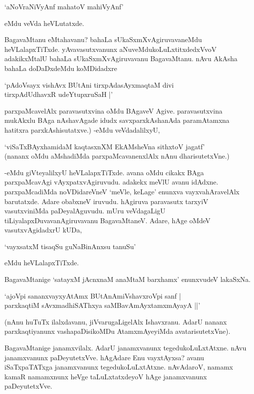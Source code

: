 \begin{shloka}
`aNoVraNiVyAnf mahatoV mahiVyAnf'
\end{shloka}

eMdu veVda heVLutatxde.

BagavaMtanu eMtahavanu? bahaLa sUkaSxmXvAgiruvavaneMdu heVLalapxTiTxde. yAvavasutxvanunx aNuveMdukoLuLxtitxdedxVvoV adakikxMtalU bahaLa sUkaSxmXvAgiruvavanu BagavaMtanu. nAvu AkAsha bahaLa doDaDxdeMdu koMDidadxre 

\begin{shloka}
`pAdoV\s sayx vishAvx BUtAni tirxpAdasAyxmaqtaM divi\\
tirxpAdUdhavxR udeYtupxruSaH‌ |'
\end{shloka}

parxpaMcavelAlx paravasutxvina oMdu BAgaveV Agive. paravasutxvina mukAkxlu BAga nAshavAgade idudx savxparxkAshanAda paramAtamxna hatitxra parxkAshisutatxve.) -eMdu veVdadalilxyU,

\begin{shloka}
`viSaTxBAyxhamidaM kaqtasxnXM EkAMsheVna sithxtoV jagatf'\\
(nananx oMdu aMshadiMda parxpaMcavanenxlAlx nAnu dharisutetxVne.)
\end{shloka}

-eMdu giVteyalilxyU heVLalapxTiTxde. avana oMdu cikakx BAga parxpaMcavAgi vAyxpatxvAgiruvudu. adakekx meVlU avanu idAdxne. parxpaMcadiMda noVDidareVneV `meVle, keLage' enunxva vayxvahAravelAlx barutatxde. Adare obabxneV iruvudu. hAgiruva paravasutx tarxyiV vasutxviniMda paDeyalAguvudu. mUru veVdagaLigU tiLiyalapxDuvavanAgiruvavanu BagavaMtaneV. Adare, hAge oMdeV vasutxvAgidadxrU kUDa,

\begin{shloka}
`vayxsatxM tisaqSu guNaBinAnxsu tanuSu'
\end{shloka}

eMdu heVLalapxTiTxde.

BagavaMtanige `satayxM jAcnxnaM anaMtaM barxhamx' enunxvudeV lakaSxNa.

\begin{shloka}
`ajoV\s pi sananxvayxyAtAmx BUtAnAmiVshavxroV\s pi sanf |\\
parxkaqtiM sAvxmadhiSAThxya saMBavAmAyxtamxmAyayA ||'
\end{shloka}

(nAnu huTuTx ilalxdavanu, jiVvarugaLigelAlx Ishavxranu. AdarU nananx parxkaqtiyanunx vashapaDisikoMDu AtamxmAyeyiMda avatarisutetxVne).


BagavaMtanige janamxvilalx. AdarU janamxvanunx tegedukoLuLxtAtxne. nAvu janamxvanunx paDeyutetxVve. hAgAdare Enu vayxtAyxsa? avanu iSaTxpaTATxga janamxvanunx tegedukoLuLxtAtxne. nAvAdaroV, namamx kamaR namamxnunx heVge taLuLxtatxdeyoV hAge janamxvanunx paDeyutetxVve.

